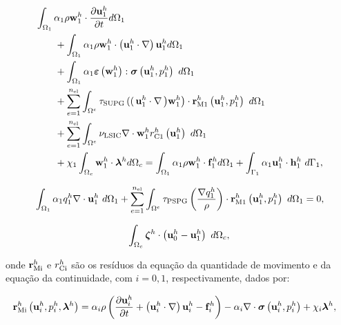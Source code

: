 \documentclass[tese_patricia]{subfiles}
\begin{document}
\begin{align}
	\begin{split}
		&\int_{\domain_1} \arlequinWFLocal \density \wlocalh \cdot \frac{\partial\ulocalh}{\partial t} d\domain_{1} \\ 
		&\qquad+
		\int_{\domain_1} \arlequinWFLocal \density \wlocalh \cdot  \left(\ulocalh \cdot \nabla\right)\ulocalh d\domain_{1}  \\ 
		&\qquad+	
		\int_{\domain_{1}} \arlequinWFLocal \straintensor \left(\wlocalh\right) : \stresstensor \left(\ulocalh,\plocalh\right)\ d\domain_{1} 
		\\ 
		&\qquad+ \sum_{e=1}^{\nel} \int_{\domainE} \SUPG  \left( \right(\ulocalh \cdot \nabla \left) \wlocalh\right) \cdot \resMomLocal\left(\ulocalh,\plocalh \right)\  d\domain_{1} \\ 
		&\qquad+\sum_{e=1}^{\nel} \int_{\domainE} \LSIC \nabla \cdot \wlocalh \resPreLocal
		\left(\ulocalh\right)\  d\domain_{1} \\
		&\qquad+ \chi_{1} \int_{\domain_c} \wlocalh \cdot \lagrangeMultiplier^{h} d\domain_{c}  = \int_{\domain_1} \arlequinWFLocal \density \wlocalh \cdot  \sbodyforce_{1}^{h} d\domain_{1} + \int_{\boundary_{1}} \arlequinWFLocal \ulocalh \cdot \straction_{1}^{h}\ d\boundary_{1},
		\label{eq:FinalSystem1}
	\end{split}
\end{align}


\begin{align}
	\begin{split}
		&	\int_{\Omega_{1}} \alpha_1 q_1^h \nabla \cdot \mathbf{u}_1^h \ d\Omega_{1} +
		\sum_{e=1}^{n_{\mathrm{el}}} \int_{\Omega^e} \tau_{\mathrm{PSPG}} \left(\frac{\nabla q_1^h}{\rho}\right) \cdot \mathbf{r}_{\mathrm{M1}}^{h} \left(\mathbf{u}_1^h,p_1^h\right) \  d\Omega_{1} = 0,\\
		\label{eq:RC1}
	\end{split}
\end{align}

\begin{align}
	\int_{\Omega_{c}}  \boldsymbol{\zeta}^h  \cdot \left(\mathbf{u}_0^h - \mathbf{u}_1^h \right) \ d\Omega_{c}, 
		\label{eq:EqAcopla}
\end{align}



\noindent onde $\mathbf{r}_{\mathrm{Mi}}^{h}$ e ${r_{\mathrm{Ci}}^{h}}$ são os resíduos da equação da quantidade de movimento e da equação da continuidade, com $i=0,1$, respectivamente, dados por:

\begin{align}
	\mathbf{r}_{\mathrm{Mi}}^{h} \left(\mathbf{u}_i^{h},p_i^{h},\boldsymbol{\lambda}^h \right)&=\alpha_{i} \rho\left(\frac{\partial\mathbf{u}_i^{h}}{\partial t}+ \left( \mathbf{u}_i^{h} \cdot \nabla \right) \mathbf{u}_i^{h} - \mathbf{f}_i^{h}\right) - \alpha_{i} \nabla \cdot \boldsymbol{\sigma}\left(\mathbf{u}_i^{h},p_i^{h}\right)+ \chi_{i} \boldsymbol{\lambda}^h \label{eq:resMomI},
\end{align}
\end{document}
